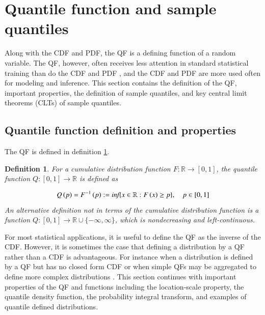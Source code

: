 \documentclass[preprint,12pt,authoryear]{elsarticle}
\newtheorem{definition}{Definition}
\newcommand{\1}[1]{\mathds{1}\left[#1\right]}
\begin{document}
\section{Quantile function and sample quantiles} \label{sec:quant_func}


Along with the CDF and PDF, the QF is a defining function of a random variable. 
The QF, however, often receives less attention in standard statistical 
training than do the CDF and PDF \cite[]{parzen2004quantile}, and the CDF and 
PDF are more used often for modeling and inference.
This section contains the definition of the QF, important properties, the 
definition of sample quantiles, and key central limit theorems (CLTs) of sample 
quantiles.

\subsection{Quantile function definition and properties}

The QF is defined in definition \ref{def:qf}.


\begin{definition}
    \label{def:qf}
    For a cumulative distribution function $F: \mathbb{R} \rightarrow 
    \left[ 0,1 \right]$, 
    the quantile function $Q: \left[0,1\right] 
    \rightarrow \mathbb{R}$ is defined as 
    
    \begin{equation*}
    \label{eq:qf}
        Q\left(p\right) = F^{-1}\left(p\right) := 
        \emph{inf}\{x \in \mathbb{R} : F\left(x\right) \geq p\}, 
        \quad p \in \left[0,1\right]
    \end{equation*}
    An alternative definition not in terms of the cumulative distribution 
    function is a function 
    $Q: \left[0,1\right] \rightarrow \mathbb{R} \cup \{-\infty, \infty\}$, which is 
    nondecreasing and left-continuous. 
\end{definition}

For most statistical applications, it is useful to define the QF as the inverse 
of the CDF. However, it is sometimes the case that defining a distribution by 
a QF rather than a CDF is advantageous. For instance when a distribution is 
defined by a 
QF but has no closed form CDF or when simple QFs may be aggregated to define 
more complex distributions 
\cite[]{perepolkin2023tenets, gasthaus2019probabilistic, alvarez2023quantile}. 
This section continues with important properties of the QF and functions 
including the location-scale property, the quantile density function, the 
probability integral transform, and examples of quantile defined distributions.
\end{document}
